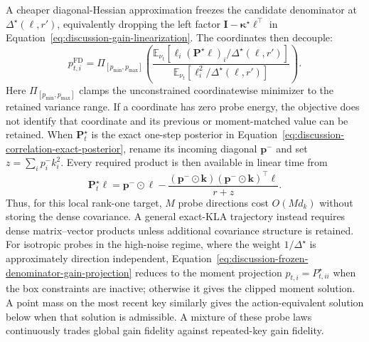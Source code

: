 \documentclass[11pt]{article}
\newcommand{\vct}[1]{\boldsymbol{#1}}
\begin{document}
A cheaper diagonal-Hessian approximation freezes the candidate denominator at
$\Delta^\star(\vct{\ell},r')$, equivalently dropping the left factor
$\vct{I}-\vct{\kappa}^\star\vct{\ell}^\top$ in
Equation~\eqref{eq:discussion-gain-linearization}. The coordinates then decouple:
\begin{equation}
  p_{t,i}^{\mathrm{FD}}
  =\Pi_{[p_{\min},p_{\max}]}\!\left(
    \frac{
      \mathbb{E}_{\nu_t}\!\left[
        \ell_i(\vct{P}^\star\vct{\ell})_i/
        \Delta^\star(\vct{\ell},r')
      \right]}
    {
      \mathbb{E}_{\nu_t}\!\left[
        \ell_i^2/\Delta^\star(\vct{\ell},r')
      \right]}
  \right).
  \label{eq:discussion-frozen-denominator-gain-projection}
\end{equation}
Here $\Pi_{[p_{\min},p_{\max}]}$ clamps the unconstrained coordinatewise minimizer to the retained
variance range.
If a coordinate has zero probe energy, the objective does not identify that coordinate and its
previous or moment-matched value can be retained. When $\vct{P}_t^\star$ is the exact one-step
posterior in Equation~\eqref{eq:discussion-correlation-exact-posterior}, rename its incoming
diagonal $\vct{p}^{-}$ and set $z=\sum_i p_i^-k_i^2$. Every required product is then available in
linear time from
\begin{equation}
  \vct{P}_t^\star\vct{\ell}
  =\vct{p}^{-}\odot\vct{\ell}
   -\frac{(\vct{p}^{-}\odot\vct{k})
     (\vct{p}^{-}\odot\vct{k})^\top\vct{\ell}}
    {r+z}.
  \label{eq:discussion-rank-one-probe-product}
\end{equation}
Thus, for this local rank-one target, $M$ probe directions cost $O(Md_k)$ without storing the
dense covariance. A general exact-KLA trajectory instead requires dense matrix--vector products
unless additional covariance structure is retained. For isotropic probes in the high-noise regime,
where the weight $1/\Delta^\star$ is approximately direction independent,
Equation~\eqref{eq:discussion-frozen-denominator-gain-projection} reduces to the moment projection
$p_{t,i}=P_{t,ii}^\star$ when the box constraints are inactive; otherwise it gives the clipped
moment solution. A point mass on the most recent key similarly gives the action-equivalent solution
below when that solution is admissible. A mixture of these probe laws continuously trades global
gain fidelity against repeated-key gain fidelity.
\end{document}
